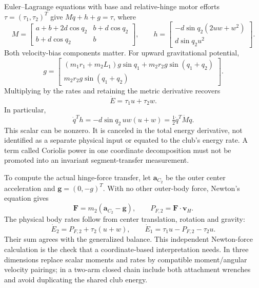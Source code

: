 Euler--Lagrange equations with base and relative-hinge motor efforts
$\tau=(\tau_1,\tau_2)^T$ give $M\ddot q+h+g=\tau$, where
\begin{equation}
M=\begin{bmatrix}
a+b+2d\cos q_2&b+d\cos q_2\\
b+d\cos q_2&b
\end{bmatrix},\qquad
h=\begin{bmatrix}-d\sin q_2(2uw+w^2)\\d\sin q_2u^2\end{bmatrix}.
\label{eq:energy_two_link_dynamics}
\end{equation}
Both velocity-bias components matter. For upward gravitational potential,
\begin{equation}
g=\begin{bmatrix}
(m_1r_1+m_2L_1)g\sin q_1+m_2r_2g\sin(q_1+q_2)\\
m_2r_2g\sin(q_1+q_2)
\end{bmatrix}.
\label{eq:energy_two_link_gravity}
\end{equation}
Multiplying by the rates and retaining the metric derivative recovers
\begin{equation}
\dot E=\tau_1u+\tau_2w.
\label{eq:double_pend_power}
\end{equation}
In particular,
\begin{equation}
\dot q^T h=-d\sin q_2\,uw(u+w)
 =\tfrac12\dot q^T\dot M\dot q.
\label{eq:coriolis_power}
\end{equation}
This scalar can be nonzero. It is canceled in the total energy derivative,
not identified as a separate physical input or equated to the club's energy
rate. A term called Coriolis power in one coordinate decomposition must not be
promoted into an invariant segment-transfer measurement.

To compute the actual hinge-force transfer, let $\mathbf a_{C_2}$ be the outer
center acceleration and $\mathbf g=(0,-g)^T$. With no other outer-body force,
Newton's equation gives
\begin{equation}
\mathbf F=m_2(\mathbf a_{C_2}-\mathbf g),
\qquad P_{F,2}=\mathbf F\cdot\mathbf v_H.
\label{eq:coriolis_power_numerical}
\end{equation}
The physical body rates follow from center translation, rotation and gravity:
\begin{equation}
\dot E_2=P_{F,2}+\tau_2(u+w),\qquad
\dot E_1=\tau_1u-P_{F,2}-\tau_2u.
\label{eq:coriolis_power_late}
\end{equation}
Their sum agrees with the generalized balance. This independent Newton-force
calculation is the check that a coordinate-based interpretation needs. In
three dimensions replace scalar moments and rates by compatible moment/angular
velocity pairings; in a two-arm closed chain include both attachment wrenches
and avoid duplicating the shared club energy.

